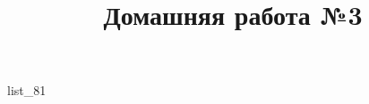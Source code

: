 \documentclass[12pt, a4paper]{article}
\begin{document}
	\title{Домашняя работа №3}
	{list_81}
\end{document}
